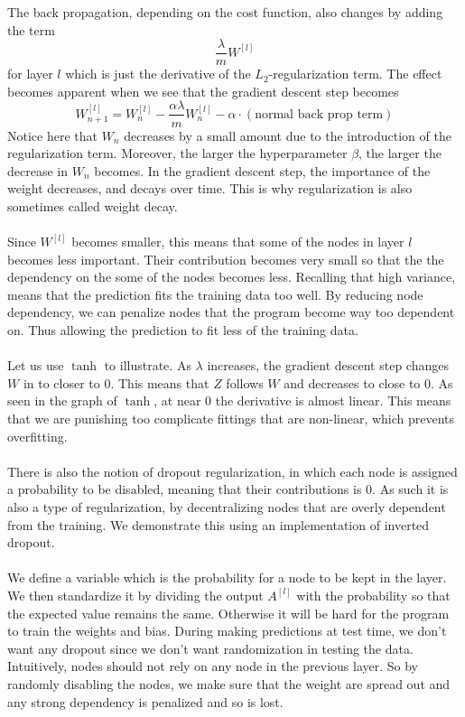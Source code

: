 \documentclass[a4paper]{article}
\begin{document}
The back propagation, depending on the cost function, also changes by adding the term $$\frac{\lambda}{m}W^{[l]}$$ for layer $l$ which is just the derivative of the $L_2$-regularization term. The effect becomes apparent when we see that the gradient descent step becomes $$W_{n+1}^{[l]}=W_n^{[l]}-\frac{\alpha\lambda}{m}W_n^{[l]}-\alpha\cdot(\text{normal back prop term})$$ Notice here that $W_n$ decreases by a small amount due to the introduction of the regularization term. Moreover, the larger the hyperparameter $\beta$, the larger the decrease in $W_n$ becomes. In the gradient descent step, the importance of the weight decreases, and decays over time. This is why regularization is also sometimes called weight decay. \\~\\
Since $W^{[l]}$ becomes smaller, this means that some of the nodes in layer $l$ becomes less important. Their contribution becomes very small so that the the dependency on the some of the nodes becomes less. Recalling that high variance, means that the prediction fits the training data too well. By reducing node dependency, we can penalize nodes that the program become way too dependent on. Thus allowing the prediction to fit less of the training data. \\~\\
Let us use $\tanh$ to illustrate. As $\lambda$ increases, the gradient descent step changes $W$ in to closer to $0$. This means that $Z$ follows $W$ and decreases to close to $0$. As seen in the graph of $\tanh$, at near $0$ the derivative is almost linear. This means that we are punishing too complicate fittings that are non-linear, which prevents overfitting. \\~\\
There is also the notion of dropout regularization, in which each node is assigned a probability to be disabled, meaning that their contributions is $0$. As such it is also a type of regularization, by decentralizing nodes that are overly dependent from the training. We demonstrate this using an implementation of inverted dropout. \\~\\
We define a variable which is the probability for a node to be kept in the layer. We then standardize it by dividing the output $A^{[l]}$ with the probability so that the expected value remains the same. Otherwise it will be hard for the program to train the weights and bias. During making predictions at test time, we don't want any dropout since we don't want randomization in testing the data. Intuitively, nodes should not rely on any node in the previous layer. So by randomly disabling the nodes, we make sure that the weight are spread out and any strong dependency is penalized and so is lost. \\~\\
\end{document}

